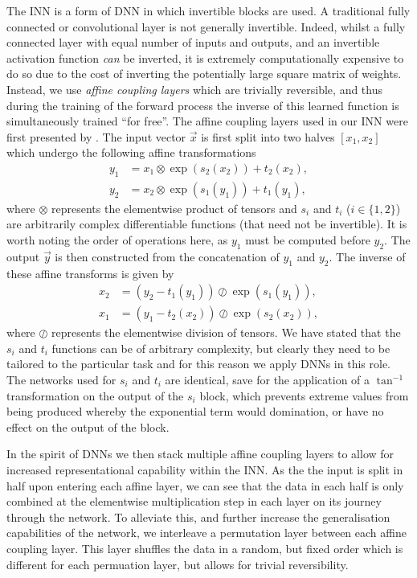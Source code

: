 The INN is a form of DNN in which invertible blocks are used.
A traditional fully connected or convolutional layer is not generally invertible.
Indeed, whilst a fully connected layer with equal number of inputs and outputs, and an invertible activation function \emph{can} be inverted, it is extremely computationally expensive to do so due to the cost of inverting the potentially large square matrix of weights.
Instead, we use \emph{affine coupling layers} \citep{2014Dinh,2016Dinh} which are trivially reversible, and thus during the training of the forward process the inverse of this learned function is simultaneously trained ``for free''.
The affine coupling layers used in our INN were first presented by \citet{2018Ardizzone}.
The input vector $\vec{x}$ is first split into two halves $[x_1, x_2]$ which undergo the following affine transformations
\begin{align}
    y_1 &= x_1 \otimes \exp(s_2(x_2)) + t_2(x_2),\\
    y_2 &= x_2 \otimes \exp(s_1(y_1)) + t_1(y_1),
\end{align}
where $\otimes$ represents the elementwise product of tensors and $s_i$ and $t_i$ ($i \in \{1, 2\}$) are arbitrarily complex differentiable functions (that need not be invertible).
It is worth noting the order of operations here, as $y_1$ must be computed before $y_2$.
The output $\vec{y}$ is then constructed from the concatenation of $y_1$ and $y_2$.
The inverse of these affine transforms is given by
\begin{align}
    x_2 &= (y_2 - t_1(y_1)) \oslash \exp(s_1(y_1)),\\
    x_1 &= (y_1 - t_2(x_2)) \oslash \exp(s_2(x_2)),
\end{align}
where $\oslash$ represents the elementwise division of tensors.
We have stated that the $s_i$ and $t_i$ functions can be of arbitrary complexity, but clearly they need to be tailored to the particular task and for this reason we apply DNNs in this role.
The networks used for $s_i$ and $t_i$ are identical, save for the application of a $\tan^{-1}$ transformation on the output of the $s_i$ block, which prevents extreme values from being produced whereby the exponential term would domination, or have no effect on the output of the block.

In the spirit of DNNs we then stack multiple affine coupling layers to allow for increased representational capability within the INN.
As the the input is split in half upon entering each affine layer, we can see that the data in each half is only combined at the elementwise multiplication step in each layer on its journey through the network.
To alleviate this, and further increase the generalisation capabilities of the network, we interleave a permutation layer between each affine coupling layer.
This layer shuffles the data in a random, but fixed order which is different for each permuation layer, but allows for trivial reversibility.

